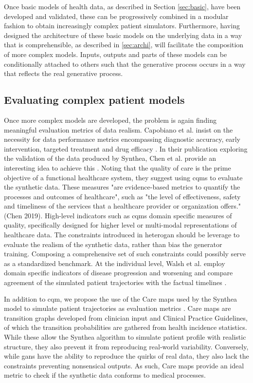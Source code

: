 Once basic models of health data, as described in Section \ref{sec:basic}, have been developed and validated, these can be progressively combined in a modular fashion to obtain increasingly complex patient simulators. Furthermore, having designed the architecture of these basic models on the underlying data in a way that is comprehensible, as described in \ref{sec:archi}, will facilitate the composition of more complex models. Inputs, outputs and parts of these models can be conditionally attached to others such that the generative process occurs in a way that reflects the real generative process.

\subsection{Evaluating complex patient models \label{sec:evaluation-cqm}}
Once more complex models are developed, the problem is again finding meaningful evaluation metrics of data realism. Capobiano et al. insist on the necessity for data performance metrics encompassing diagnostic accuracy, early intervention, targeted treatment and drug efficacy \cite{Capobianco2020}. In their publication exploring the validation of the data produced by Synthea, Chen et al. provide an interesting idea to achieve this \cite{Chen_2019}. Noting that the quality of care is the prime objective of a functional healthcare system, they suggest using \glspl{cqm} to evaluate the synthetic data. These measures "are evidence-based metrics to quantify the processes and outcomes of healthcare", such as "the level of effectiveness, safety and timeliness of the services that a healthcare provider or organization offers."(Chen 2019). High-level indicators such as \glspl{cqm} domain specific measures of quality, specifically designed for higher level or multi-modal representations of healthcare data. The constraints introduced in \gls{heterogan} should be leverage to evaluate the realism of the synthetic data, rather than bias the generator training. Composing a comprehensive set of such constraints could possibly serve as a standardized benchmark.
At the individual level, Walsh et al. employ domain specific indicators of disease progression and worsening and compare agreement of the simulated patient trajectories with the factual timelines \cite{walsh2020generating}.\par
In addition to \gls{cqm}, we propose the use of the Care maps used by the Synthea model to simulate patient trajectories as evaluation metrics \cite{Walonoski_2017}. Care maps are transition graphs developed from clinician input and Clinical Practice Guidelines, of which the transition probabilities are gathered from health incidence statistics. While these allow the Synthea algorithm to simulate patient profile with realistic structure, they also prevent it from reproducing real-world variability. Conversely, while \glspl{gan} have the ability to reproduce the quirks of real data, they also lack the constraints preventing nonsensical outputs. As such, Care maps provide an ideal metric to check if the synthetic data conforms to medical processes.\par 
